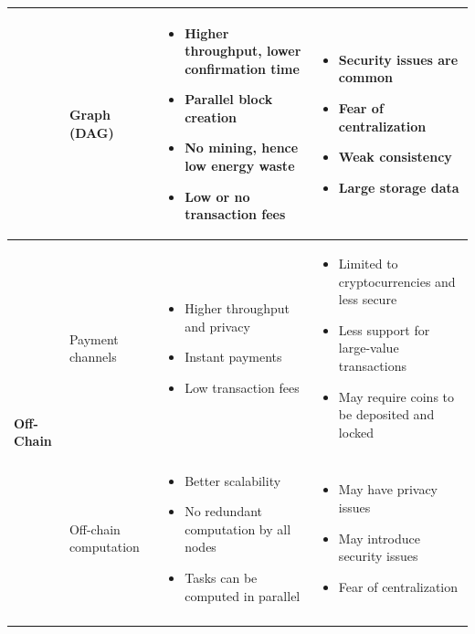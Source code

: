 \begin{table}[htbp]
{\begin{tabularx}{\textwidth}{@{}p{2.4cm} p{2.7cm} >{\raggedright\arraybackslash}X >{\raggedright\arraybackslash}X@{}}
& Graph (DAG) &
\begin{itemize}
  \item Higher throughput, lower confirmation time
  \item Parallel block creation
  \item No mining, hence low energy waste
  \item Low or no transaction fees
\end{itemize} &
\begin{itemize}
  \item Security issues are common
  \item Fear of centralization
  \item Weak consistency
  \item Large storage data
\end{itemize} \\
\midrule

\multirow{4}{*}{\textbf{Off-Chain}}
& Payment channels &
\begin{itemize}
  \item Higher throughput and privacy
  \item Instant payments
  \item Low transaction fees
\end{itemize} &
\begin{itemize}
  \item Limited to cryptocurrencies and less secure
  \item Less support for large-value transactions
  \item May require coins to be deposited and locked
\end{itemize} \\ \cmidrule(l){2-4}

& Off-chain computation &
\begin{itemize}
  \item Better scalability
  \item No redundant computation by all nodes
  \item Tasks can be computed in parallel
\end{itemize} &
\begin{itemize}
  \item May have privacy issues
  \item May introduce security issues
  \item Fear of centralization
\end{itemize} \\ \cmidrule(l){2-4}


\end{tabularx}}
\end{table}
